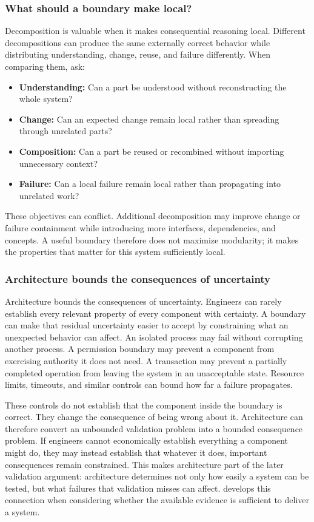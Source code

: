 \subsubsection{What should a boundary make local?}\label{sec-boundary-local}

Decomposition is valuable when it makes consequential reasoning local.
Different decompositions can produce the same externally correct behavior while distributing understanding, change, reuse, and failure differently.
When comparing them, ask:

\begin{itemize}
\tightlist
\item
  \textbf{Understanding:} Can a part be understood without reconstructing the whole system?
\item
  \textbf{Change:} Can an expected change remain local rather than spreading through unrelated parts?
\item
  \textbf{Composition:} Can a part be reused or recombined without importing unnecessary context?
\item
  \textbf{Failure:} Can a local failure remain local rather than propagating into unrelated work?
\end{itemize}

These objectives can conflict.
Additional decomposition may improve change or failure containment while introducing more interfaces, dependencies, and concepts.
A useful boundary therefore does not maximize modularity; it makes the properties that matter for this system sufficiently local.

\subsubsection{Architecture bounds the consequences of uncertainty}\label{sec-bounded-consequence}

Architecture bounds the consequences of uncertainty. Engineers can rarely establish every relevant
property of every component with certainty. A boundary can make that residual uncertainty easier to
accept by constraining what an unexpected behavior can affect. An isolated process may fail without
corrupting another process. A permission boundary may prevent a component from exercising authority
it does not need. A transaction may prevent a partially completed operation from leaving the system
in an unacceptable state. Resource limits, timeouts, and similar controls can bound how far a
failure propagates.

These controls do not establish that the component inside the boundary is correct. They change the
consequence of being wrong about it. Architecture can therefore convert an unbounded validation
problem into a bounded consequence problem. If engineers cannot economically establish everything a
component might do, they may instead establish that whatever it does, important consequences remain
constrained. This makes architecture part of the later validation argument: architecture determines
not only how easily a system can be tested, but what failures that validation misses can affect.
\citet{ch-validation} develops this connection when considering whether the available evidence is
sufficient to deliver a system.

